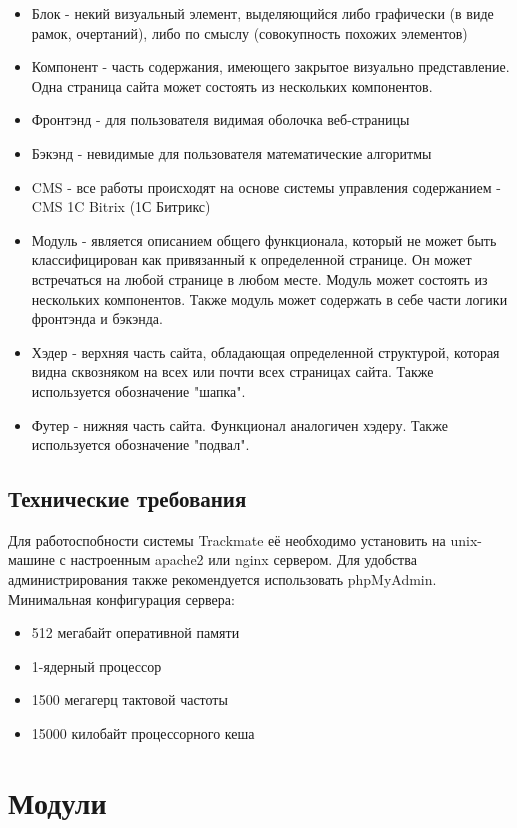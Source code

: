 \documentclass[DIV=calc, paper=a4, fontsize=11pt]{scrartcl} %
\begin{document}
        \begin{itemize}
        \item Блок - некий визуальный элемент, выделяющийся либо графически (в виде рамок, очертаний), либо по смыслу (совокупность похожих элементов)
        \item Компонент - часть содержания, имеющего закрытое визуально представление. Одна страница сайта может состоять из нескольких компонентов.
        \item Фронтэнд - для пользователя видимая оболочка веб-страницы
        \item Бэкэнд - невидимые для пользователя математические алгоритмы
        \item CMS - все работы происходят на основе системы управления содержанием - CMS 1C Bitrix (1С Битрикс)
        \item Модуль - является описанием общего функционала, который не может быть классифицирован как привязанный к определенной странице. Он может встречаться на любой странице в любом месте. Модуль может состоять из нескольких компонентов. Также модуль может содержать в себе части логики фронтэнда и бэкэнда.
        \item Хэдер - верхняя часть сайта, обладающая определенной структурой, которая видна сквозняком на всех или почти всех страницах сайта. Также используется обозначение "шапка".
        \item Футер - нижняя часть сайта. Функционал аналогичен хэдеру. Также используется обозначение "подвал".
    \end{itemize}
    
\subsection{Технические требования}
Для работоспобности системы Trackmate её необходимо установить на unix-машине с настроенным apache2 или nginx сервером.
Для удобства администрирования также рекомендуется использовать phpMyAdmin.
\\[0.5cm]
Минимальная конфигурация сервера:
\begin{itemize}
	\item 512 мегабайт оперативной памяти
	\item 1-ядерный процессор
	\item 1500 мегагерц тактовой частоты
	\item 15000 килобайт процессорного кеша
\end{itemize}


\section{Модули}
\end{document}
